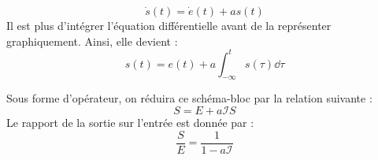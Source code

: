 \[
    \dot{s}(t)=\dot{e}(t)+as(t)
\]
Il est plus d'intégrer l'équation différentielle avant de la représenter
graphiquement. Ainsi, elle devient :
\[
    s(t)=e(t)+a\int_{-\infty}^t s(\tau) \dd{\tau}
\]
\begin{center}
    
\end{center}
Sous forme d'opérateur, on réduira ce schéma-bloc par 
la relation suivante :
\[
    S=E+a\mathcal{I}S
\]
Le rapport de la sortie sur l'entrée est donnée par :
\[
    \dfrac{S}{E}=\dfrac{1}{1-a\mathcal{I}}
\]
